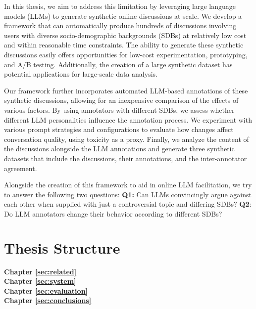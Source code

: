 In this thesis, we aim to address this limitation by leveraging large language models (LLMs) to generate synthetic online discussions at scale. We develop a framework that can automatically produce hundreds of discussions involving users with diverse socio-demographic backgrounds (SDBs) at relatively low cost and within reasonable time constraints. The ability to generate these synthetic discussions easily offers opportunities for low-cost experimentation, prototyping, and A/B testing. Additionally, the creation of a large synthetic dataset has potential applications for large-scale data analysis.

Our framework further incorporates automated LLM-based annotations of these synthetic discussions, allowing for an inexpensive comparison of the effects of various factors. By using annotators with different SDBs, we assess whether different LLM personalities influence the annotation process. We experiment with various prompt strategies and configurations to evaluate how changes affect conversation quality, using toxicity as a proxy. Finally, we analyze the content of the discussions alongside the LLM annotations and generate three synthetic datasets that include the discussions, their annotations, and the inter-annotator agreement.

Alongside the creation of this framework to aid in online LLM facilitation, we try to answer the following two questions: \textbf{Q1:} Can LLMs convincingly argue against each other when supplied with just a controversial topic and differing SDBs? \textbf{Q2}: Do LLM annotators change their behavior according to different SDBs?

\section{Thesis Structure}
\label{sec:intro:structure}

\textbf{Chapter \ref{sec:related}} \\[0.2em]


\textbf{Chapter \ref{sec:system}} \\[0.2em]


\textbf{Chapter \ref{sec:evaluation}} \\[0.2em]


\textbf{Chapter \ref{sec:conclusions}} \\[0.2em]



